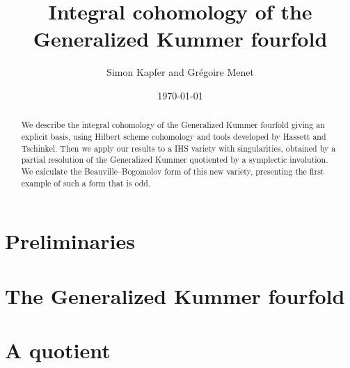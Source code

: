 \documentclass[a4paper]{article}
\begin{document}
\title{\bf Integral cohomology of the Generalized Kummer fourfold}


\author{Simon Kapfer and Gr\'egoire Menet}


\date{\today}

\maketitle
\begin{abstract}
We describe the integral cohomology of the Generalized Kummer fourfold giving an explicit basis, using Hilbert scheme cohomology and tools developed by Hassett and Tschinkel.
Then we apply our results to a IHS variety with singularities, obtained by a partial resolution of the Generalized Kummer quotiented by a symplectic involution. 
We calculate the Beauville--Bogomolov form of this new variety, presenting the first example of such a form that is odd.
\end{abstract}


\part{Preliminaries}







\part{The Generalized Kummer fourfold}\label{integralcohomology}




\part{A quotient}\label{quotient}



\end{document}
